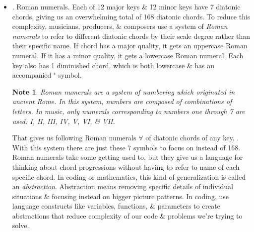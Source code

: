 \documentclass{article}
\newtheorem{note}{Note}
\begin{document}
\begin{itemize}
\begin{itemize}
		Can refer to these chords by their scale degree (1st, 2nd, 3rd, 4th, 5th, 6th, \& 7th). A chord built on 5th note of a scale would be ``5'' chord for that key. If we're in any {\it major key}, 1st, 4th, \& 5th diatonic chords will have a major quality (regardless of starting note of key). Further, 2nd, 3rd, \& 6th chords will always have a minor quality, \& 7th chord is diminished. E.g., in C major, would have following diatonic chords: CMaj Dmin Emin FMaj GMaj Amin Bdim. This pattern of chord qualities is same for any major key because all of major keys have same pattern of note intervals. Same idea is true for minor keys. Because all minor keys have same pattern of intervals, quality of chords stays consistent. 1st, 4th, \& 5th diatonic chords are minor quality. 3rd, 6th, \& 7th chords are major quality. 2nd chord is diminished. In C minor, e.g., would have following diatonic chords: Cmin Ddim E$\flat$Maj Fmin Gmin A$\flat$Maj B$\flat$Maj. In popular music, chord progressions are made up almost entirely of diatonic chords. Recall from prev chap: melody of a song is also built on this harmonic scaffold. Melodies often use primarily notes from underlying chord progression, because these notes are more consonant \& pleasing. Notes from outside harmony are typically used in passing as decoration or as a neighboring tone.
		\item {. Roman numerals.} Each of 12 major keys \& 12 minor keys have 7 diatonic chords, giving us an overwhelming total of 168 diatonic chords. To reduce this complexity, musicians, producers, \& composers use a system of {\it Roman numerals} to refer to different diatonic chords by their scale degree rather than their specific name. If chord has a major quality, it gets an uppercase Roman numeral. If it has a minor quality, it gets a lowercase Roman numeral. Each key also has 1 diminished chord, which is both lowercase \& has an accompanied ${}^\circ$ symbol.
		\begin{note}
			Roman numerals are a system of numbering which originated in ancient Rome. In this system, numbers are composed of combinations of letters. In music, only numerals corresponding to numbers one through 7 are used: I, II, III, IV, V, VI, \& VII.
		\end{note}
		That gives us following Roman numerals $\forall$ of diatonic chords of any key. {}. With this system there are just these 7 symbols to focus on instead of 168. Roman numerals take some getting used to, but they give us a language for thinking about chord progressions without having tp refer to name of each specific chord. In coding or mathematics, this kind of generalization is called an {\it abstraction}. Abstraction means removing specific details of individual situations \& focusing instead on bigger picture patterns. In coding, use language constructs like variables, functions, \& parameters to create abstractions that reduce complexity of our code \& problems we're trying to solve.

\end{itemize}
\end{itemize}
\end{document}
